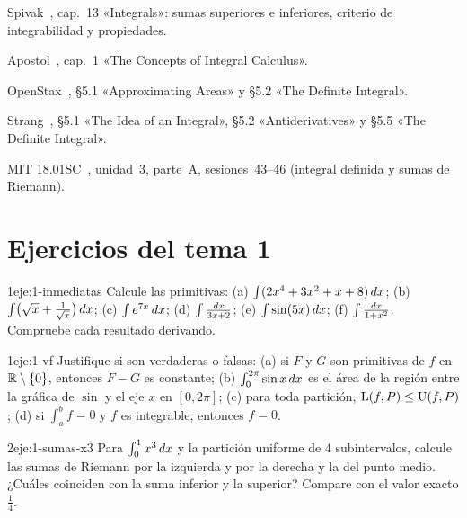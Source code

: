 \begin{lecturas}
\item Spivak~\cite{spivak}, cap.~13 «Integrals»: sumas superiores e inferiores, criterio de integrabilidad y propiedades.
\item Apostol~\cite{apostol}, cap.~1 «The Concepts of Integral Calculus».
\item OpenStax~\cite{openstax1}, §5.1 «Approximating Areas» y §5.2 «The Definite Integral».
\item Strang~\cite{strang}, §5.1 «The Idea of an Integral», §5.2 «Antiderivatives» y §5.5 «The Definite Integral».
\item MIT 18.01SC~\cite{mit1801}, unidad~3, parte~A, sesiones~43--46 (integral definida y sumas de Riemann).
\end{lecturas}

\section*{Ejercicios del tema 1}

\begin{ejercicio}{1}{eje:1-inmediatas}
Calcule las primitivas: (a) $\int(2x^{4}+3x^{2}+x+8)\mathop{}\!d x$; (b) $\int\bigl(\sqrt{x}+\frac{1}{\sqrt{x}}\bigr)\mathop{}\!d x$; (c) $\int e^{7x}\mathop{}\!d x$; (d) $\int\frac{\mathop{}\!d x}{3x+2}$; (e) $\int\sin(5x)\mathop{}\!d x$; (f) $\int\frac{\mathop{}\!d x}{1+x^{2}}$. Compruebe cada resultado derivando.
\end{ejercicio}

\begin{ejercicio}{1}{eje:1-vf}
Justifique si son verdaderas o falsas: (a) si $F$ y $G$ son primitivas de $f$ en $\mathbb{R}\setminus\{0\}$, entonces $F-G$ es constante; (b) $\int_0^{2\pi}\sin x\mathop{}\!d x$ es el área de la región entre la gráfica de $\sin$ y el eje $x$ en $[0,2\pi]$; (c) para toda partición, $\operatorname{L}(f,P)\le\operatorname{U}(f,P)$; (d) si $\int_a^b f=0$ y $f$ es integrable, entonces $f=0$.
\end{ejercicio}

\begin{ejercicio}{2}{eje:1-sumas-x3}
Para $\int_0^1x^{3}\mathop{}\!d x$ y la partición uniforme de 4 subintervalos, calcule las sumas de Riemann por la izquierda y por la derecha y la del punto medio. ¿Cuáles coinciden con la suma inferior y la superior? Compare con el valor exacto $\frac14$.
\end{ejercicio}

